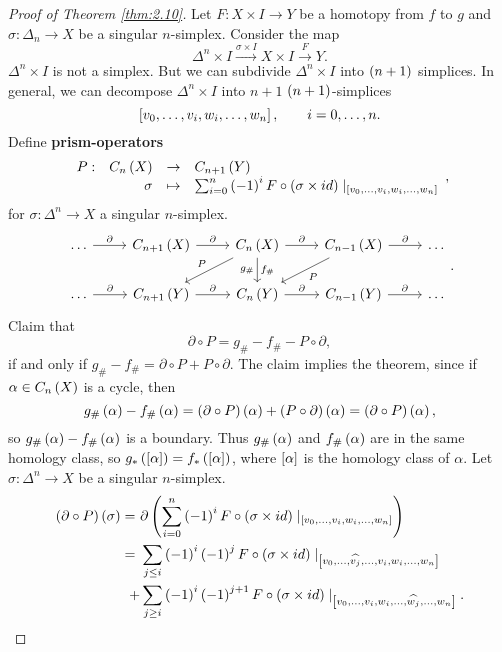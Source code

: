 \begin{proof}[Proof of Theorem \ref{thm:2.10}]
Let $ F : X \times I \to Y $ be a homotopy from $ f $ to $ g $ and $ \sigma : \Delta_n \to X $ be a singular $ n $-simplex. Consider the map
$$ \Delta^n \times I \xrightarrow{\sigma \times I} X \times I \xrightarrow{F} Y. $$
$ \Delta^n \times I $ is not a simplex. But we can subdivide $ \Delta^n \times I $ into $ \rb{n + 1} $ simplices. In general, we can decompose $ \Delta^n \times I $ into $ n + 1 $ $ \rb{n + 1} $-simplices
$$ \sb{v_0, \dots, v_i, w_i, \dots, w_n}, \qquad i = 0, \dots, n. $$
Define \textbf{prism-operators}
$$ \function[P]{C_n\rb{X}}{C_{n + 1}\rb{Y}}{\sigma}{\sum_{i = 0}^n \rb{-1}^iF \circ \rb{\sigma \times id} \mid_{\sb{v_0, \dots, v_i, w_i, \dots, w_n}}}, $$
for $ \sigma : \Delta^n \to X $ a singular $ n $-simplex.
$$
\begin{tikzcd}
\dots \arrow{r}{\partial} & C_{n + 1}\rb{X} \arrow{r}{\partial} & C_n\rb{X} \arrow{r}{\partial} \arrow[swap]{dl}{P} \arrow{d}{f_\#}[swap]{g_\#} & C_{n - 1}\rb{X} \arrow{r}{\partial} \arrow{dl}{P} & \dots \\
\dots \arrow{r}{\partial} & C_{n + 1}\rb{Y} \arrow{r}{\partial} & C_n\rb{Y} \arrow{r}{\partial} & C_{n - 1}\rb{Y} \arrow{r}{\partial} & \dots
\end{tikzcd}.
$$
Claim that
$$ \partial \circ P = g_\# - f_\# - P \circ \partial, $$
if and only if $ g_\# - f_\# = \partial \circ P + P \circ \partial $. The claim implies the theorem, since if $ \alpha \in C_n\rb{X} $ is a cycle, then
$$ g_\#\rb{\alpha} - f_\#\rb{\alpha} = \rb{\partial \circ P}\rb{\alpha} + \rb{P \circ \partial}\rb{\alpha} = \rb{\partial \circ P}\rb{\alpha}, $$
so $ g_\#\rb{\alpha} - f_\#\rb{\alpha} $ is a boundary. Thus $ g_\#\rb{\alpha} $ and $ f_\#\rb{\alpha} $ are in the same homology class, so $ g_*\rb{\sb{\alpha}} = f_*\rb{\sb{\alpha}} $, where $ \sb{\alpha} $ is the homology class of $ \alpha $. Let $ \sigma : \Delta^n \to X $ be a singular $ n $-simplex.
\begin{align*}
\rb{\partial \circ P}\rb{\sigma}
= \ & \partial\rb{\sum_{i = 0}^n \rb{-1}^iF \circ \rb{\sigma \times id} \mid_{\sb{v_0, \dots, v_i, w_i, \dots, w_n}}} \\
= \ & \sum_{j \le i} \rb{-1}^i\rb{-1}^jF \circ \rb{\sigma \times id} \mid_{\sb{v_0, \dots, \widehat{v_j}, \dots, v_i, w_i, \dots, w_n}} \\
+ & \sum_{j \ge i} \rb{-1}^i\rb{-1}^{j + 1}F \circ \rb{\sigma \times id} \mid_{\sb{v_0, \dots, v_i, w_i, \dots, \widehat{w_j}, \dots, w_n}}.
\end{align*}

\end{proof}
